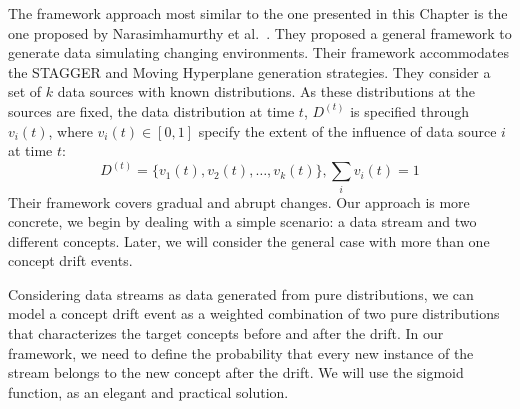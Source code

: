 The framework approach most similar to the one presented in this Chapter 
 is the one proposed by Narasimhamurthy et al.~\cite{kuncheva07}.
They proposed a general 
framework to generate data simulating
changing environments. Their framework accommodates the %
STAGGER and Moving Hyperplane generation
strategies. %
They consider a set of $k$ data sources with known distributions.
As these distributions at the sources are fixed, the data distribution
at time $t$, $D^{(t)}$ is specified through $v_i(t)$, where 
 $v_i(t) \in [0,1]$ specify the extent of the influence of data
source $i$ at time $t$:
$$D^{(t)} = \{v_1(t), v_2(t), \ldots, v_k(t) \}, \sum_{i} v_i(t)= 1$$
Their framework covers gradual and abrupt changes.
Our approach is more concrete, %
we begin by dealing 
with a simple scenario: a data stream and two different concepts. Later, we will 
consider the general case with more than one concept drift { events}. 

Considering data streams as data generated from pure distributions, we can model
a concept drift { event} as a weighted combination %
of two pure distributions that characterizes the target concepts before and after
the drift. In our framework, we need to define the probability that every new 
instance of the stream belongs to the new concept after the drift. We will use 
the sigmoid function, as an elegant and practical solution.

